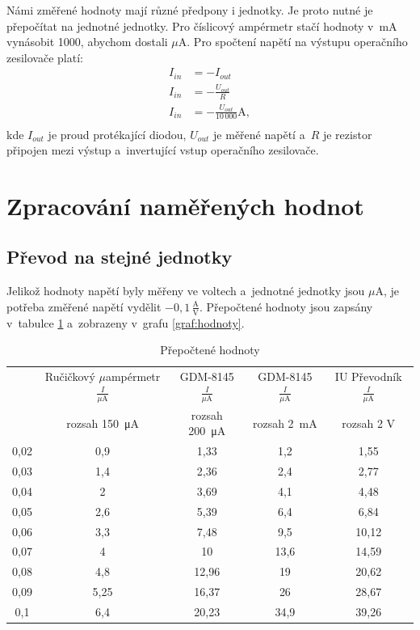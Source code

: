 \documentclass[a4paper,12pt]{article}   %
\newcommand{\tmu}{$\mu$}
\begin{document}
Námi změřené hodnoty mají různé předpony i jednotky. Je proto nutné je přepočítat na jednotné jednotky. Pro číslicový ampérmetr stačí hodnoty v~mA vynásobit 1000, abychom dostali \tmu A. Pro spočtení napětí na výstupu operačního zesilovače platí:
\begin{equation}
    \begin{split}
        I_{in}&=-I_{out}\\
        I_{in}&=-\frac{U_{out}}{R}\\
        I_{in}&=-\frac{U_{out}}{10\,000} \textrm{A},\\
    \end{split}
    \label{eq:iu}
\end{equation}
kde $I_{out}$ je proud protékající diodou, $U_{out}$ je měřené napětí a~$R$ je rezistor připojen mezi výstup a~invertující vstup operačního zesilovače.



\section{Zpracování naměřených hodnot}

\subsection{Převod na stejné jednotky}
Jelikož hodnoty napětí byly měřeny ve voltech a~jednotné jednotky jsou \tmu A, je potřeba změřené napětí vydělit $-0,1\,\frac{\textrm{A}}{\textrm{V}}$. Přepočtené hodnoty jsou zapsány v~tabulce \ref{tab:prepocteno} a~zobrazeny v~grafu \ref{graf:hodnoty}.

\begin{table}[h!]
    \centering
    \begin{tabular}{|c|c|c|c|c|}
        \hline
        \rule{0pt}{2.5ex}
        \multirow{2}{*}{Napětí na děliči $\frac{U}{\textrm{V}}$}& Ručičkový \tmu ampérmetr$\frac{I}{\mu\textrm{A}}$ 	&GDM-8145 $\frac{I}{\mu\textrm{A}}$	&GDM-8145 $\frac{I}{\mu\textrm{A}}$	&IU Převodník $\frac{I}{\mu\textrm{A}}$  \\[.7ex]
        & rozsah  150~μA & rozsah 200~μA & rozsah  2~mA & rozsah  2 V\\\hline\hline
        0,02    &0,9    &1,33   &1,2    &1,55   \\\hline
        0,03    &1,4    &2,36   &2,4    &2,77   \\\hline
        0,04    &2      &3,69   &4,1    &4,48   \\\hline
        0,05    &2,6    &5,39   &6,4    &6,84   \\\hline
        0,06    &3,3    &7,48   &9,5    &10,12  \\\hline
        0,07    &4      &10     &13,6   &14,59  \\\hline
        0,08    &4,8    &12,96  &19     &20,62  \\\hline
        0,09    &5,25   &16,37  &26     &28,67  \\\hline
        0,1     &6,4    &20,23  &34,9   &39,26  \\\hline
    \end{tabular}
    \caption{Přepočtené hodnoty}
    \label{tab:prepocteno}
\end{table}
\end{document}
